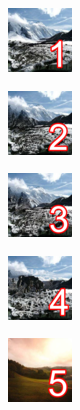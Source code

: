 \documentclass[11pt, a4paper]{article}
\begin{document}
\begin{task}
    \begin{gridlayout}{\textwidth}{12cm}
        \begin{row}{0.33}
            \begin{cell}{0.25}
                \centering
                \includegraphics[width=0.9\cellwidth]{img/thumbnail-1.png}
            \end{cell}
            \begin{cell}{0.25}
                \centering
                \includegraphics[width=0.9\cellwidth]{img/thumbnail-2.png}
            \end{cell}
            \begin{cell}{0.25}
                \centering
                \includegraphics[width=0.9\cellwidth]{img/thumbnail-3.png}
            \end{cell}
            \begin{cell}{0.25}
                \centering
                \includegraphics[width=0.9\cellwidth]{img/thumbnail-4.png}
            \end{cell}
        \end{row}
        \begin{row}{0.33}
            \begin{cell}{0.25}
                \centering
                \includegraphics[width=0.9\cellwidth]{img/thumbnail-5.png}

\end{cell}
\end{row}
\end{gridlayout}
\end{task}
\end{document}
